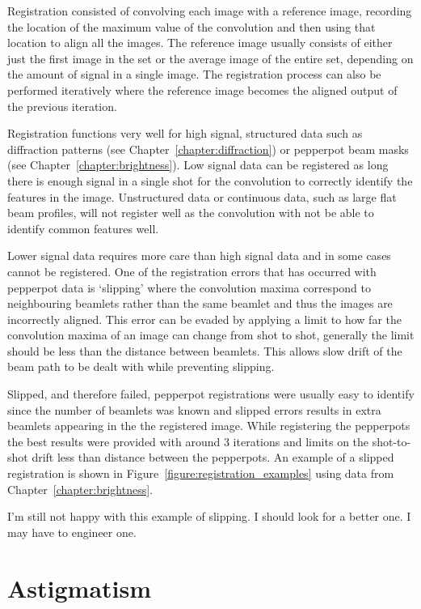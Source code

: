 Registration consisted of convolving each image with a reference image, recording the location of the maximum value of the convolution and then using that location to align all the images.
The reference image usually consists of either just the first image in the set or the average image of the entire set, depending on the amount of signal in a single image.
The registration process can also be performed iteratively where the reference image becomes the aligned output of the previous iteration.

Registration functions very well for high signal, structured data such as diffraction patterns (see Chapter~\ref{chapter:diffraction}) or pepperpot beam masks (see Chapter~\ref{chapter:brightness}).
Low signal data can be registered as long there is enough signal in a single shot for the convolution to correctly identify the features in the image.
Unstructured data or continuous data, such as large flat beam profiles, will not register well as the convolution with not be able to identify common features well.

Lower signal data requires more care than high signal data and in some cases cannot be registered.
One of the registration errors that has occurred with pepperpot data is `slipping' where the convolution maxima correspond to neighbouring beamlets rather than the same beamlet and thus the images are incorrectly aligned.
This error can be evaded by applying a limit to how far the convolution maxima of an image can change from shot to shot, generally the limit should be less than the distance between beamlets.
This allows slow drift of the beam path to be dealt with while preventing slipping.

Slipped, and therefore failed, pepperpot registrations were usually easy to identify since the number of beamlets was known and slipped errors results in extra beamlets appearing in the the registered image.
While registering the pepperpots the best results were provided with around 3 iterations and limits on the shot-to-shot drift less than distance between the pepperpots.
An example of a slipped registration is shown in Figure~\ref{figure:registration_examples} using data from Chapter~\ref{chapter:brightness}.

{\color{red} I'm still not happy with this example of slipping. I should look for a better one. I may have to engineer one.}

\section{Astigmatism}\label{section:quadrupole}

